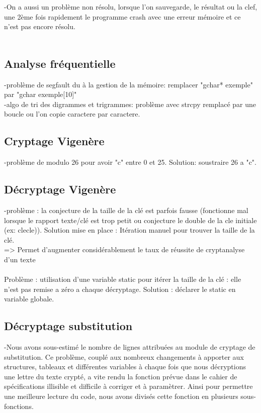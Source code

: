 \documentclass[a4]{article}
\begin{document}
	-On a aussi un problème non résolu, lorsque l'on sauvegarde, le résultat ou la clef, une 2ème fois rapidement le programme crash 
	avec une erreur mémoire et ce n'est pas encore résolu.\\
	\\
	
	\subsection{Analyse fréquentielle}
	-problème de segfault du à la gestion de la mémoire: remplacer "gchar* exemple" par "gchar exemple[10]"\\
	-algo de tri des digrammes et trigrammes: problème avec strcpy remplacé par une boucle ou l'on copie caractere par caractere.
	
	\subsection{Cryptage Vigenère}
	-problème de modulo 26 pour avoir "c" entre 0 et 25. Solution: soustraire 26 a "c".
	\subsection{Décryptage Vigenère}
	-problème : la conjecture de la taille de la clé est parfois fausse (fonctionne mal lorsque le rapport
		texte/clé est trop petit ou conjecture le double de la cle initiale (ex: clecle)).
		Solution mise en place : Itération manuel pour trouver la taille de la clé.\\
		=> Permet d'augmenter considérablement le taux de réussite de cryptanalyse d'un texte \\ \\
	Problème : utilisation d'une variable static pour itérer la taille de la clé : elle n'est pas remise
	a zéro a chaque décryptage.
	Solution : déclarer le static en variable globale.
	
	\subsection{Décryptage substitution}
	 -Nous avons sous-estimé le nombre de lignes attribuées au module de cryptage de substitution.
	  Ce problème, couplé aux nombreux changements à apporter aux structures, tableaux et différentes
	  variables à chaque fois que nous décryptions une lettre du texte crypté, a vite rendu la fonction
	  prévue dans le cahier de spécifications illisible et difficile à corriger et à paramètrer. Ainsi 
	  pour permettre une meilleure lecture du code, nous avons divisés cette fonction en plusieurs sous-fonctions. \\ \\
    
\end{document}
